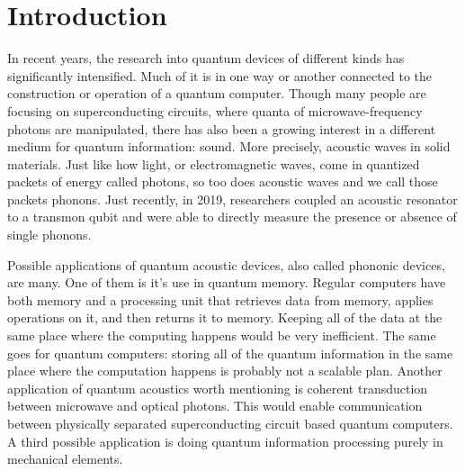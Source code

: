 \chapter{Introduction}


In recent years, the research into quantum devices of different kinds has
significantly intensified.
Much of it is in one way or another connected to the
construction or operation of a quantum computer.
Though many people are focusing on superconducting circuits, where quanta of
microwave-frequency photons are manipulated, there has also been
a growing interest in a different medium for quantum information: sound.
More precisely, acoustic waves in solid materials.
Just like how light, or electromagnetic waves, come in quantized packets of energy called
photons,
so too does acoustic waves and we call those packets phonons.
Just recently, in 2019, researchers coupled an acoustic resonator to a transmon
qubit and were able to directly measure the presence or absence of single
phonons.

Possible applications of quantum acoustic devices, also called phononic devices, are many.
One of them is it's use in quantum memory.
Regular computers have both memory and a processing unit that
retrieves data from memory, applies operations on it, and then returns it to
memory.
Keeping all of the data at the same place where the computing happens would be
very inefficient.
The same goes for quantum computers: storing all of the quantum information in
the same place where the computation happens is probably not a scalable plan.
Another application of quantum acoustics worth mentioning is
coherent transduction between microwave and optical photons.
This would enable communication between physically separated superconducting
circuit based quantum computers\cite{laer_controlling_2019}.
A third possible application is doing quantum information processing purely in
mechanical elements\cite{qiao2023developing}.

